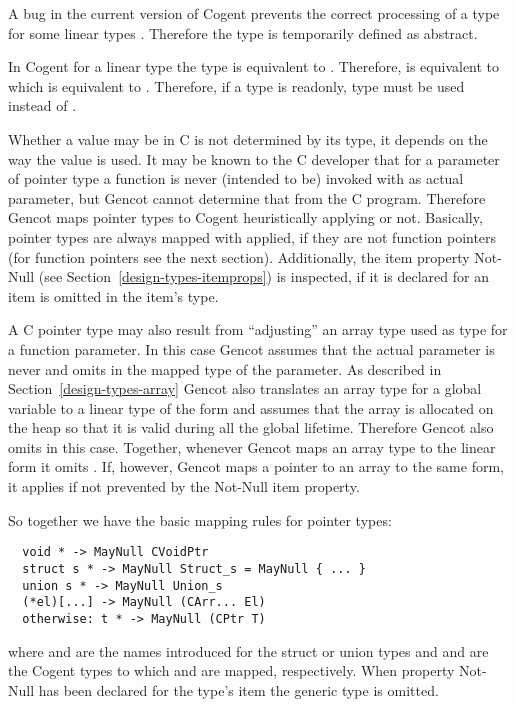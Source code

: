 A bug in the current version of Cogent prevents the correct processing of a type  for some linear types 
. Therefore the type  is temporarily defined as abstract.

In Cogent for a linear type  the type  is equivalent to . Therefore,  is 
equivalent to  which is equivalent to . Therefore, if a type  is readonly,
type  must be used instead of .

Whether a value may be  in C is not determined by its type, it depends on the way the value is used. It may be known
to the C developer that for a parameter of pointer type a function is never (intended to be) invoked with  as actual
parameter, but Gencot cannot determine that from the C program. Therefore Gencot maps pointer types to Cogent heuristically 
applying  or not. Basically, pointer types are always mapped with  applied, if they are not 
function pointers (for function pointers see the next section). Additionally, the item property Not-Null (see 
Section~\ref{design-types-itemprops}) is inspected, if it is declared for an item  is omitted in the item's type. 

A C pointer type may also result from ``adjusting'' an array type used as type for a function parameter. In this case Gencot
assumes that the actual parameter is never  and omits  in the mapped type of the parameter.
As described in Section~\ref{design-types-array} Gencot also translates an array type for a global variable to a linear
type of the form  and assumes that the array is allocated on the heap so that it is valid during all 
the global lifetime. Therefore Gencot also omits  in this case. Together, whenever Gencot maps an array type
to the linear form  it omits . If, however, Gencot maps a pointer to an array to the 
same form, it applies  if not prevented by the Not-Null item property.

So together we have the basic mapping rules for pointer types:
\begin{verbatim}
  void * -> MayNull CVoidPtr
  struct s * -> MayNull Struct_s = MayNull { ... }
  union s * -> MayNull Union_s
  (*el)[...] -> MayNull (CArr... El)
  otherwise: t * -> MayNull (CPtr T)
\end{verbatim}
where  and  are the names introduced for the struct or union types and  
and  are the Cogent types to which  and  are mapped, respectively. When property
Not-Null has been declared for the type's item the generic type  is omitted.

